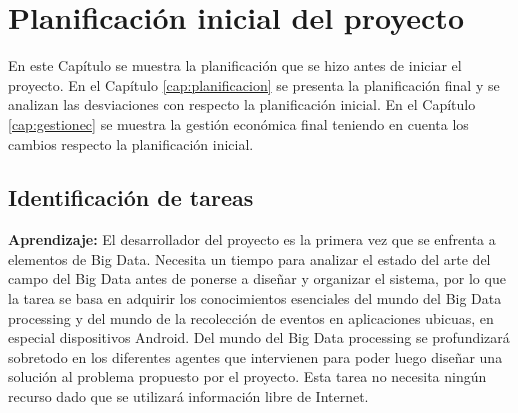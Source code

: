 \chapter{Planificación inicial del proyecto}\label{cap:planini}

En este Capítulo se muestra la planificación que se hizo antes de iniciar el proyecto. En el Capítulo \ref{cap:planificacion} se presenta la planificación final y se analizan las desviaciones con respecto la planificación inicial. En el Capítulo \ref{cap:gestionec} se muestra la gestión económica final teniendo en cuenta los cambios respecto la planificación inicial.

\section{Identificación de tareas}
\textbf{Aprendizaje:} El desarrollador del proyecto es la primera vez que se enfrenta a elementos de Big Data. Necesita un tiempo para analizar el estado del arte del campo del Big Data antes de ponerse a diseñar y organizar el sistema, por lo que la tarea se basa en adquirir los conocimientos esenciales del mundo del Big Data processing y del mundo de la recolección de eventos en aplicaciones ubicuas, en especial dispositivos Android. Del mundo del Big Data processing se profundizará sobretodo en los diferentes agentes que intervienen para poder luego diseñar una solución al problema propuesto por el proyecto. Esta tarea no necesita ningún recurso dado que se utilizará información libre de Internet.

